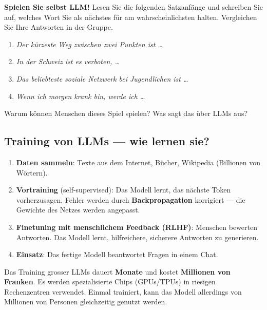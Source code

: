 \begin{myexercise}
\textbf{Spielen Sie selbst LLM!} Lesen Sie die folgenden Satzanfänge und schreiben
Sie auf, welches Wort Sie als nächstes für am wahrscheinlichsten halten.
Vergleichen Sie Ihre Antworten in der Gruppe.

\begin{enumerate}
    \item \textit{Der kürzeste Weg zwischen zwei Punkten ist \ldots}
    \item \textit{In der Schweiz ist es verboten, \ldots}
    \item \textit{Das beliebteste soziale Netzwerk bei Jugendlichen ist \ldots}
    \item \textit{Wenn ich morgen krank bin, werde ich \ldots}
\end{enumerate}

Warum können Menschen dieses Spiel spielen? Was sagt das über LLMs aus?
\end{myexercise}

\subsection{Training von LLMs --- wie lernen sie?}

\begin{myprocedure}
\begin{enumerate}
    \item \textbf{Daten sammeln}: Texte aus dem Internet, Bücher, Wikipedia
          (Billionen von Wörtern).
    \item \textbf{Vortraining} (self-supervised): Das Modell lernt, das nächste
          Token vorherzusagen. Fehler werden durch \textbf{Backpropagation}
          korrigiert --- die Gewichte des Netzes werden angepasst.
    \item \textbf{Finetuning mit menschlichem Feedback (RLHF)}: Menschen bewerten
          Antworten. Das Modell lernt, hilfreichere, sicherere Antworten zu generieren.
    \item \textbf{Einsatz}: Das fertige Modell beantwortet Fragen in einem Chat.
\end{enumerate}
\end{myprocedure}

\begin{myremark}
Das Training grosser LLMs dauert \textbf{Monate} und kostet \textbf{Millionen von
Franken}. Es werden spezialisierte Chips (GPUs/TPUs) in riesigen Rechenzentren
verwendet. Einmal trainiert, kann das Modell allerdings von Millionen von Personen
gleichzeitig genutzt werden.
\end{myremark}

